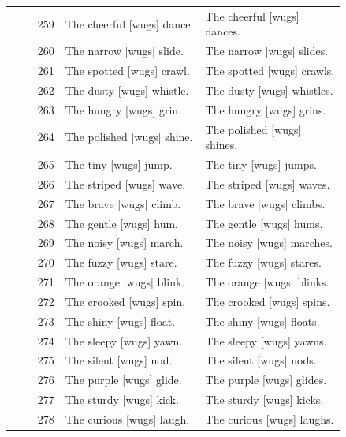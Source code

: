 \begin{longtable}{@{}rp{0.42\linewidth}p{0.42\linewidth}@{}}
259 & The cheerful {[}wugs{]} dance. & The cheerful {[}wugs{]} dances. \\
260 & The narrow {[}wugs{]} slide. & The narrow {[}wugs{]} slides. \\
261 & The spotted {[}wugs{]} crawl. & The spotted {[}wugs{]} crawls. \\
262 & The dusty {[}wugs{]} whistle. & The dusty {[}wugs{]} whistles. \\
263 & The hungry {[}wugs{]} grin. & The hungry {[}wugs{]} grins. \\
264 & The polished {[}wugs{]} shine. & The polished {[}wugs{]} shines. \\
265 & The tiny {[}wugs{]} jump. & The tiny {[}wugs{]} jumps. \\
266 & The striped {[}wugs{]} wave. & The striped {[}wugs{]} waves. \\
267 & The brave {[}wugs{]} climb. & The brave {[}wugs{]} climbs. \\
268 & The gentle {[}wugs{]} hum. & The gentle {[}wugs{]} hums. \\
269 & The noisy {[}wugs{]} march. & The noisy {[}wugs{]} marches. \\
270 & The fuzzy {[}wugs{]} stare. & The fuzzy {[}wugs{]} stares. \\
271 & The orange {[}wugs{]} blink. & The orange {[}wugs{]} blinks. \\
272 & The crooked {[}wugs{]} spin. & The crooked {[}wugs{]} spins. \\
273 & The shiny {[}wugs{]} float. & The shiny {[}wugs{]} floats. \\
274 & The sleepy {[}wugs{]} yawn. & The sleepy {[}wugs{]} yawns. \\
275 & The silent {[}wugs{]} nod. & The silent {[}wugs{]} nods. \\
276 & The purple {[}wugs{]} glide. & The purple {[}wugs{]} glides. \\
277 & The sturdy {[}wugs{]} kick. & The sturdy {[}wugs{]} kicks. \\
278 & The curious {[}wugs{]} laugh. & The curious {[}wugs{]} laughs. \\
\end{longtable}
